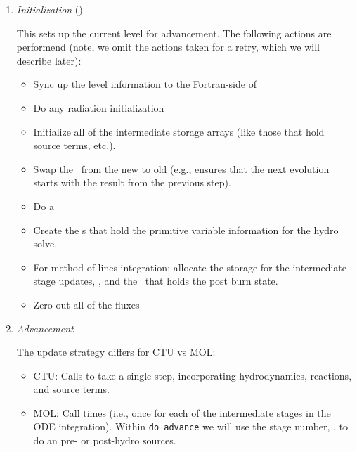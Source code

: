 \begin{enumerate}
\item {\em Initialization} ()

  This sets up the current level for advancement.  The following
  actions are performend (note, we omit the actions taken for a retry,
  which we will describe later):
  \begin{itemize}
  \item Sync up the level information to the Fortran-side of \castro

  \item Do any radiation initialization

  \item Initialize all of the intermediate storage arrays (like those
    that hold source terms, etc.).

  \item Swap the \statedata\ from the new to old (e.g., ensures that
    the next evolution starts with the result from the previous step).

  \item Do a 

  \item Create the \multifab s that hold the primitive variable information
   for the hydro solve.

  \item For method of lines integration: allocate the storage for the 
    intermediate stage updates, , and the  \multifab\
    that holds the post burn state.

  \item Zero out all of the fluxes

  \end{itemize}

      

\item {\em Advancement} 

  The update strategy differs for CTU vs MOL:
  \begin{itemize}
  \item CTU: Calls  to take a single step,
    incorporating hydrodynamics, reactions, and source terms.

  \item MOL: Call   times
    (i.e., once for each of the intermediate stages in the ODE
    integration).  Within {\tt do\_advance} we will use the stage
    number, \variable{mol\_iteration}, to do an pre- or post-hydro
    sources.


\end{itemize}
\end{enumerate}
